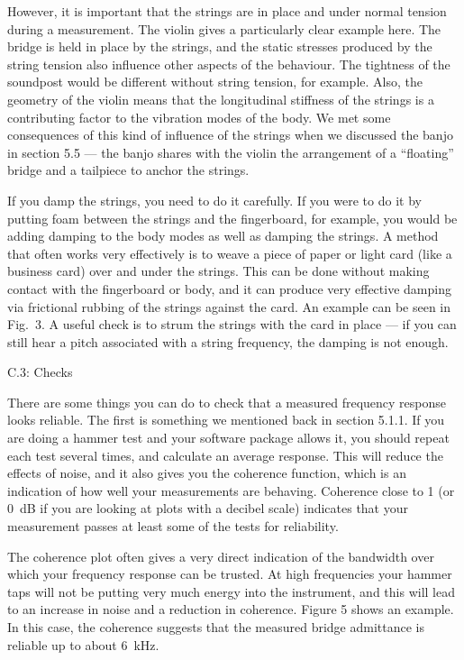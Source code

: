  However, it is important that the strings are in place and under normal 
  tension during a measurement. The violin gives a particularly clear example 
  here. The bridge is held in place by the strings, and the static stresses 
  produced by the string tension also influence other aspects of the behaviour. 
  The tightness of the soundpost would be different without string tension, for 
  example. Also, the geometry of the violin means that the longitudinal 
  stiffness of the strings is a contributing factor to the vibration modes of 
  the body. We met some consequences of this kind of influence of the strings 
  when we discussed the banjo in section 5.5 — the banjo shares with the violin 
  the arrangement of a “floating” bridge and a tailpiece to anchor the strings. 

  If you damp the strings, you need to do it carefully. If you were to do it by 
  putting foam between the strings and the fingerboard, for example, you would 
  be adding damping to the body modes as well as damping the strings. A method 
  that often works very effectively is to weave a piece of paper or light card 
  (like a business card) over and under the strings. This can be done without 
  making contact with the fingerboard or body, and it can produce very 
  effective damping via frictional rubbing of the strings against the card. An 
  example can be seen in Fig.\ 3. A useful check is to strum the strings with 
  the card in place — if you can still hear a pitch associated with a string 
  frequency, the damping is not enough. 

  C.3: Checks 

  There are some things you can do to check that a measured frequency response 
  looks reliable. The first is something we mentioned back in section 5.1.1. If 
  you are doing a hammer test and your software package allows it, you should 
  repeat each test several times, and calculate an average response. This will 
  reduce the effects of noise, and it also gives you the coherence function, 
  which is an indication of how well your measurements are behaving. Coherence 
  close to 1 (or 0~dB if you are looking at plots with a decibel scale) 
  indicates that your measurement passes at least some of the tests for 
  reliability. 

  The coherence plot often gives a very direct indication of the bandwidth over 
  which your frequency response can be trusted. At high frequencies your hammer 
  taps will not be putting very much energy into the instrument, and this will 
  lead to an increase in noise and a reduction in coherence. Figure 5 shows an 
  example. In this case, the coherence suggests that the measured bridge 
  admittance is reliable up to about 6~kHz. 

